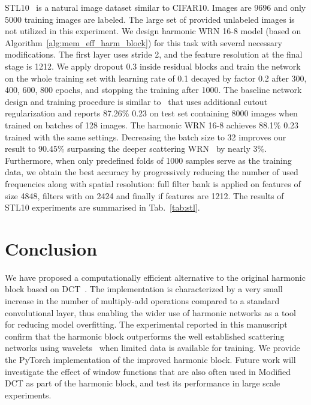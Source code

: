 \documentclass[conference]{IEEEtran}
\begin{document}
STL10~\cite{STL10} is a natural image dataset similar to CIFAR10. Images are 9696 and only 5000 training images are labeled. The large set of provided unlabeled images is not utilized in this experiment. We design harmonic WRN 16-8 model (based on Algorithm~\ref{alg:mem_eff_harm_block}) for this task with several necessary modifications. The first layer uses stride 2, and the feature resolution at the final stage is 1212. We apply dropout 0.3 inside residual blocks and train the network on the whole training set with learning rate of 0.1 decayed by factor 0.2 after 300, 400, 600, 800 epochs, and stopping the training after 1000. The baseline network design and training procedure is similar to~\cite{Devries17} that uses additional cutout regularization and reports 87.26\%  0.23 on test set containing 8000 images when trained on batches of 128 images. The harmonic WRN 16-8 achieves 88.1\%  0.23 trained with the same settings. Decreasing the batch size to 32 improves our result to 90.45\% surpassing the deeper scattering WRN~\cite{Oyallon18} by nearly 3\%. Furthermore, when only predefined folds of 1000 samples serve as the training data, we obtain the best accuracy by progressively reducing the number of used frequencies along with spatial resolution: full filter bank is applied on features of size 4848, filters with  on 2424 and finally  if features are 1212. The results of STL10 experiments are summarised in Tab.~\ref{tab:stl}.

\section{Conclusion}

We have proposed a computationally efficient alternative to the original harmonic block based on DCT~\cite{Ulicny18}. The implementation is characterized by a very small increase in the number of multiply-add operations compared to a standard convolutional layer, thus enabling the wider use of harmonic networks as a tool for reducing model overfitting.
The experimental reported in this manuscript confirm that the harmonic block outperforms the well established scattering networks using wavelets~\cite{Bruna13,Oyallon18} when limited data is available for training. We provide the PyTorch implementation of the improved harmonic block.
Future work will investigate the effect of window functions that are also often used in Modified DCT as part of the harmonic block, and test its performance in large scale experiments. 



\end{document}
